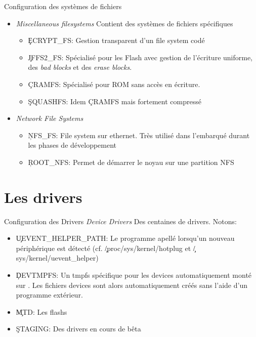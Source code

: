 \begin{frame}[fragile=singleslide]{Configuration des systèmes de fichiers}
  \begin{itemize}
  \item  \emph{Miscellaneous  filesystems}  Contient des  systèmes  de
    fichiers spécifiques
    \begin{itemize} 
    \item \c{ECRYPT_FS}: Gestion transparent d'un file system codé
    \item  \c{JFFS2_FS}: Spécialisé  pour  les Flash  avec gestion  de
      l'écriture  uniforme, des \emph{bad  blocks} et  des \emph{erase
        blocks}.
    \item \c{CRAMFS}: Spécialisé pour ROM sans accès en écriture. 
    \item  \c{SQUASHFS}: Idem \c{CRAMFS} mais fortement compressé
    \end{itemize} 
  \item \emph{Network File Systems}
    \begin{itemize}
    \item \c{NFS_FS}:  File system  sur ethernet.  Très  utilisé dans
      l'embarqué durant les phases de développement
    \item \c{ROOT_NFS}: Permet de démarrer le noyau sur une partition
      NFS
    \end{itemize} 
  \end{itemize} 
\end{frame}

\section{Les drivers}

\begin{frame}[fragile=singleslide]{Configuration des Drivers}
  \emph{Device Drivers} Des centaines de drivers. Notons:
  \begin{itemize}
  \item   \c{UEVENT_HELPER_PATH}:  Le  programme   apellé  lorsqu'un
    nouveau            périphérique            est           détecté
    (cf.              \c{/proc/sys/kernel/hotplug}             et
    \c{/sys/kernel/uevent_helper})
  \item   \c{DEVTMPFS}:   Un  tmpfs   spécifique   pour  les   devices
    automatiquement monté sur  .  Les fichiers devices sont
    alors   automatiquement   créés   sans   l'aide   d'un   programme
    extérieur.
  \item \c{MTD}: Les flashs
  \item \c{STAGING}: Des drivers en cours de bêta
  \end{itemize} 
\end{frame}

